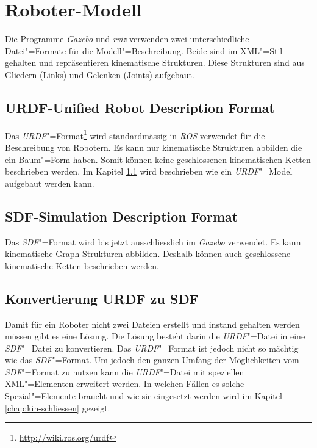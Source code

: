 

\section{Roboter-Modell} %
\label{chap:roboter-modell}

Die Programme \textit{Gazebo} und \textit{rviz} verwenden zwei unterschiedliche Datei"=Formate für die Modell"=Beschreibung.
Beide sind im XML"=Stil gehalten und repräsentieren kinematische Strukturen.
Diese Strukturen sind aus Gliedern (Links) und Gelenken (Joints) aufgebaut.

\subsection{URDF-Unified Robot Description Format}
\label{chap:urdf}
Das \textit{URDF}"=Format\footnote{\url{http://wiki.ros.org/urdf}} wird standardmässig in \textit{ROS} verwendet für die Beschreibung von Robotern.
Es kann nur kinematische Strukturen abbilden die ein Baum"=Form haben.
Somit können keine geschlossenen kinematischen Ketten beschrieben werden.
Im Kapitel \ref{chap:urdf} wird beschrieben wie ein \textit{URDF}"=Model aufgebaut werden kann.

\subsection{SDF-Simulation Description Format}
\label{chap:sdf}
Das \textit{SDF}"=Format wird bis jetzt ausschliesslich im \textit{Gazebo} verwendet.
Es kann kinematische Graph-Strukturen abbilden.
Deshalb können auch geschlossene kinematische Ketten beschrieben werden.

\subsection{Konvertierung URDF zu SDF}
\label{chap:konvertierung}
Damit für ein Roboter nicht zwei Dateien erstellt und instand gehalten werden müssen gibt es eine Lösung.
Die Lösung besteht darin die \textit{URDF}"=Datei in eine \textit{SDF}"=Datei zu konvertieren.
Das \textit{URDF}"=Format ist jedoch nicht so mächtig wie das \textit{SDF}"=Format.
Um jedoch den ganzen Umfang der Möglichkeiten vom \textit{SDF}"=Format zu nutzen kann die \textit{URDF}"=Datei mit speziellen XML"=Elementen erweitert werden.
In welchen Fällen es solche Spezial"=Elemente braucht und wie sie eingesetzt werden wird im Kapitel \ref{chap:kin-schliessen} gezeigt. 

